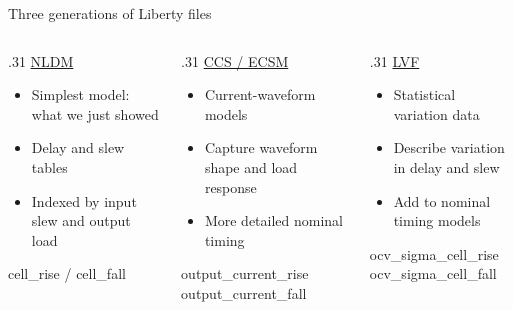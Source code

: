 \begin{frame}{Three generations of Liberty files}
\begin{columns}[T,onlytextwidth]
\begin{column}{.31\textwidth}
{\large\textcolor{NordBlue}{\underline{NLDM}}}\\[12pt]
\begin{itemize}\setlength{\itemsep}{7pt}
\item Simplest model: what we just showed
\item Delay and slew tables
\item Indexed by input slew and output load
\end{itemize}\vspace{10pt}
{\ttfamily\footnotesize cell\_rise / cell\_fall}
\end{column}
\begin{column}{.31\textwidth}
{\large\textcolor{NordBlue}{\underline{CCS / ECSM}}}\\[12pt]
\begin{itemize}\setlength{\itemsep}{7pt}
\item Current-waveform models
\item Capture waveform shape and load response
\item More detailed nominal timing
\end{itemize}\vspace{10pt}
{\ttfamily\footnotesize output\_current\_rise\\output\_current\_fall}
\end{column}
\begin{column}{.31\textwidth}
{\large\textcolor{NordBlue}{\underline{LVF}}}\\[12pt]
\begin{itemize}\setlength{\itemsep}{7pt}
\item Statistical variation data
\item Describe variation in delay and slew
\item Add to nominal timing models
\end{itemize}\vspace{10pt}
{\ttfamily\footnotesize ocv\_sigma\_cell\_rise\\ocv\_sigma\_cell\_fall}
\end{column}
\end{columns}
\end{frame}
